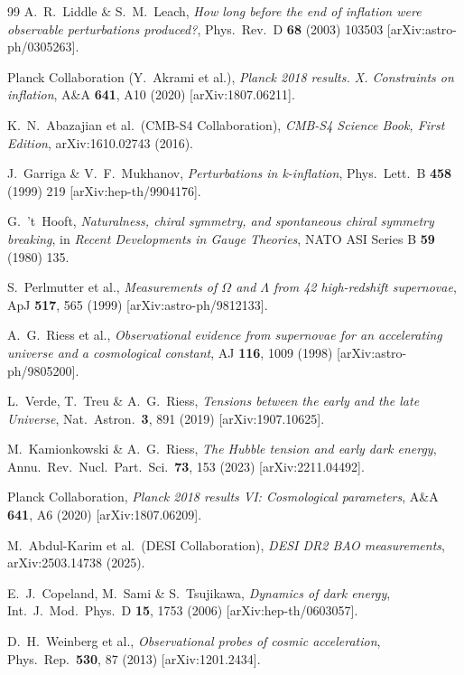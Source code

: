 \documentclass[12pt,a4paper]{article}
\renewcommand{\Omega}{\varOmega}
\begin{document}
\begin{thebibliography}{99}
A.~R.~Liddle \& S.~M.~Leach,
\emph{How long before the end of inflation were observable perturbations produced?},
Phys.\ Rev.\ D \textbf{68} (2003) 103503 [arXiv:astro-ph/0305263].

Planck Collaboration (Y.~Akrami et al.),
\emph{Planck 2018 results. X. Constraints on inflation},
A\&A \textbf{641}, A10 (2020) [arXiv:1807.06211].

K.~N.~Abazajian et al.\ (CMB-S4 Collaboration),
\emph{CMB-S4 Science Book, First Edition},
arXiv:1610.02743 (2016).

J.~Garriga \& V.~F.~Mukhanov,
\emph{Perturbations in k-inflation},
Phys.\ Lett.\ B \textbf{458} (1999) 219 [arXiv:hep-th/9904176].

G.~'t~Hooft,
\emph{Naturalness, chiral symmetry, and spontaneous chiral symmetry breaking},
in \emph{Recent Developments in Gauge Theories}, NATO ASI Series B \textbf{59} (1980) 135.

S.~Perlmutter et al.,
\emph{Measurements of $\Omega$ and $\Lambda$ from 42 high-redshift supernovae},
ApJ \textbf{517}, 565 (1999) [arXiv:astro-ph/9812133].

A.~G.~Riess et al.,
\emph{Observational evidence from supernovae for an accelerating universe and a
cosmological constant},
AJ \textbf{116}, 1009 (1998) [arXiv:astro-ph/9805200].

L.~Verde, T.~Treu \& A.~G.~Riess,
\emph{Tensions between the early and the late Universe},
Nat.\ Astron.\ \textbf{3}, 891 (2019) [arXiv:1907.10625].

M.~Kamionkowski \& A.~G.~Riess,
\emph{The Hubble tension and early dark energy},
Annu.\ Rev.\ Nucl.\ Part.\ Sci.\ \textbf{73}, 153 (2023) [arXiv:2211.04492].

Planck Collaboration,
\emph{Planck 2018 results VI: Cosmological parameters},
A\&A \textbf{641}, A6 (2020) [arXiv:1807.06209].

M.~Abdul-Karim et al.\ (DESI Collaboration),
\emph{DESI DR2 BAO measurements},
arXiv:2503.14738 (2025).

E.~J.~Copeland, M.~Sami \& S.~Tsujikawa,
\emph{Dynamics of dark energy},
Int.\ J.\ Mod.\ Phys.\ D \textbf{15}, 1753 (2006) [arXiv:hep-th/0603057].

D.~H.~Weinberg et al.,
\emph{Observational probes of cosmic acceleration},
Phys.\ Rep.\ \textbf{530}, 87 (2013) [arXiv:1201.2434].


\end{thebibliography}
\end{document}
